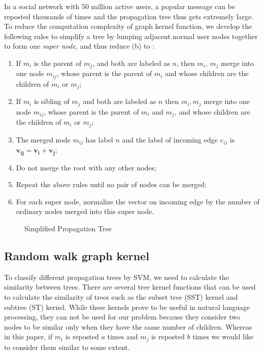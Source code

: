 In a social network with 50 million active users, a popular message can be
reposted thousands of times and the propagation tree thus gets extremely large.
To reduce the computation complexity of graph kernel function, we develop
the following rules to simplify a tree by lumping adjacent
normal user nodes together to form one {\em super node}, and thus
reduce (b) to :
\begin{enumerate}
\item If $m_i$ is the parent of $m_j$, and both are labeled as $n$,
then $m_i$, $m_j$ merge into one node $m_{ij}$,
whose parent is the parent of
$m_i$ and whose children are the children of $m_i$ or $m_j$;
\item If $m_i$ is sibling of $m_j$ and both are labeled as $n$ then
$m_i,m_j$ merge into one node $m_{ij}$, whose parent is the parent of
$m_i$ and $m_j$, and whose children are the children of $m_i$ or $m_j$;
\item The merged node $m_{ij}$ has label $n$ and the
label of incoming edge
$e_{ij}$ is $\boldsymbol{v_{ij}} = \boldsymbol{v_i} + \boldsymbol{v_j}$;
\item Do not merge the root with any other nodes;
\item Repeat the above rules until no pair of nodes can be merged;
\item For each super node, normalize the vector on incoming edge
by the number of ordinary nodes merged into this super node.
\end{enumerate}

\begin{figure}[th]
\centering
{}
\caption{Simplified Propagation Tree}
\label{fig:simplified}
\end{figure}

\subsection{Random walk graph kernel}
\label{sec:random}

To classify different propagation trees by SVM, we need to calculate the
similarity between trees. There are several tree kernel functions that
can be used to calculate the similarity of trees such as the subset tree
(SST) kernel\cite{collins2002new} and subtree (ST) kernel\cite{smola2002fast}.
While these kernels prove to be useful in natural language
processing\cite{moschitti2006making}, they can not be used for our problem
because they consider two nodes to be similar only when they have the same
number of children. Whereas in this paper, if $m_i$ is reposted $a$ times
and $m_j$ is reposted $b$ times we would like to consider them similar
to some extent.

